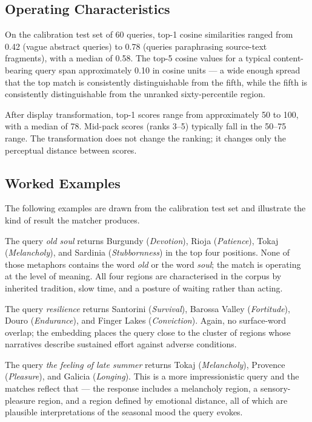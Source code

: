 \documentclass[11pt]{article}
\begin{document}
\subsection{Operating Characteristics}
On the calibration test set of 60 queries, top-1 cosine similarities ranged from 0.42 (vague abstract queries) to 0.78 (queries paraphrasing source-text fragments), with a median of 0.58. The top-5 cosine values for a typical content-bearing query span approximately 0.10 in cosine units --- a wide enough spread that the top match is consistently distinguishable from the fifth, while the fifth is consistently distinguishable from the unranked sixty-percentile region.

After display transformation, top-1 scores range from approximately 50 to 100, with a median of 78. Mid-pack scores (ranks 3--5) typically fall in the 50--75 range. The transformation does not change the ranking; it changes only the perceptual distance between scores.

\subsection{Worked Examples}
The following examples are drawn from the calibration test set and illustrate the kind of result the matcher produces.

The query \emph{old soul} returns Burgundy (\emph{Devotion}), Rioja (\emph{Patience}), Tokaj (\emph{Melancholy}), and Sardinia (\emph{Stubbornness}) in the top four positions. None of those metaphors contains the word \emph{old} or the word \emph{soul}; the match is operating at the level of meaning. All four regions are characterised in the corpus by inherited tradition, slow time, and a posture of waiting rather than acting.

The query \emph{resilience} returns Santorini (\emph{Survival}), Barossa Valley (\emph{Fortitude}), Douro (\emph{Endurance}), and Finger Lakes (\emph{Conviction}). Again, no surface-word overlap; the embedding places the query close to the cluster of regions whose narratives describe sustained effort against adverse conditions.

The query \emph{the feeling of late summer} returns Tokaj (\emph{Melancholy}), Provence (\emph{Pleasure}), and Galicia (\emph{Longing}). This is a more impressionistic query and the matches reflect that --- the response includes a melancholy region, a sensory-pleasure region, and a region defined by emotional distance, all of which are plausible interpretations of the seasonal mood the query evokes.
\end{document}
